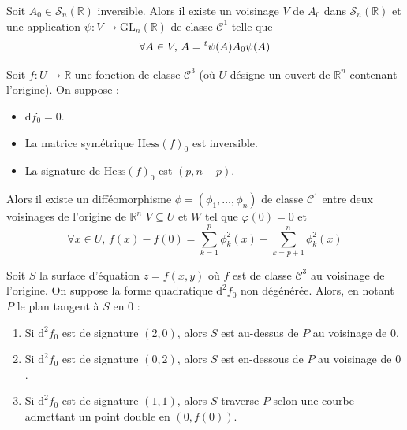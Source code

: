 
  \begin{lemma}
    Soit $A_0 \in \mathcal{S}_n(\mathbb{R})$ inversible. Alors il existe un voisinage $V$ de $A_0$ dans $\mathcal{S}_n(\mathbb{R})$ et une application $\psi : V \rightarrow \mathrm{GL}_n(\mathbb{R})$ de classe $\mathcal{C}^1$ telle que
    \[ \forall A \in V, \, A = \mathstrut ^t \psi(A) A_0 \psi(A) \]
  \end{lemma}


  \begin{lemma}
    Soit $f : U \rightarrow \mathbb{R}$ une fonction de classe $\mathcal{C}^3$ (où $U$ désigne un ouvert de $\mathbb{R}^n$ contenant l'origine). On suppose :
    \begin{itemize}
      \item $\mathrm{d} f_0 = 0$.
      \item La matrice symétrique $\mathrm{Hess} (f)_0$ est inversible.
      \item La signature de $\mathrm{Hess}(f)_0$ est $(p, n-p)$.
    \end{itemize}
    Alors il existe un difféomorphisme $\phi = (\phi_1, \dots, \phi_n)$ de classe $\mathcal{C}^1$ entre deux voisinages de l'origine de $\mathbb{R}^n$ $V \subseteq U$ et $W$ tel que $\varphi(0) = 0$ et
    \[ \forall x \in U, \, f(x) - f(0) = \sum_{k=1}^p \phi_k^2(x) - \sum_{k=p+1}^n \phi_k^2(x) \]
  \end{lemma}


  \begin{application}
    Soit $S$ la surface d'équation $z = f(x, y)$ où $f$ est de classe $\mathcal{C}^3$ au voisinage de l'origine. On suppose la forme quadratique $\mathrm{d}^2 f_0$ non dégénérée. Alors, en notant $P$ le plan tangent à $S$ en $0$ :
    \begin{enumerate}[label={\bfseries(\roman*)}]
      \item Si $\mathrm{d}^2 f_0$ est de signature $(2, 0)$, alors $S$ est au-dessus de $P$ au voisinage de $0$.
      \item Si $\mathrm{d}^2 f_0$ est de signature $(0, 2)$, alors $S$ est en-dessous de $P$ au voisinage de $0$.
      \item Si $\mathrm{d}^2 f_0$ est de signature $(1, 1)$, alors $S$ traverse $P$ selon une courbe admettant un point double en $(0, f(0))$.
    \end{enumerate}
  \end{application}

